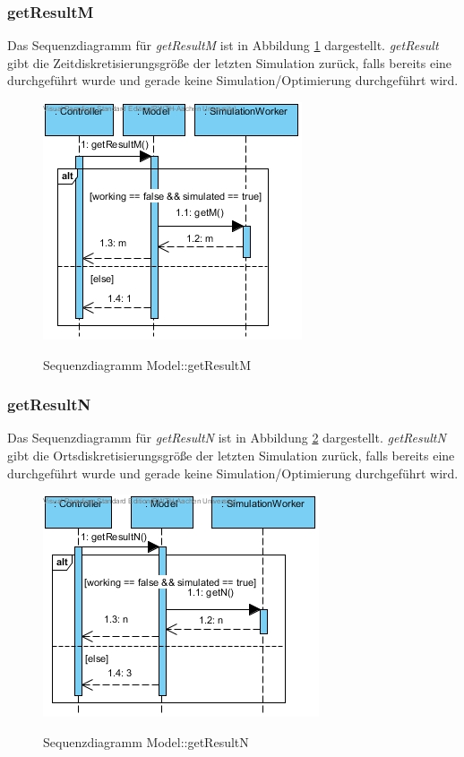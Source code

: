 \subsubsection*{getResultM}

Das Sequenzdiagramm für \emph{getResultM} ist in Abbildung \ref{Sequenzdiagramm Model::getResultM} dargestellt. \emph{getResult} gibt die Zeitdiskretisierungsgröße der letzten Simulation zurück, falls bereits eine durchgeführt wurde und gerade keine Simulation/Optimierung durchgeführt wird.

\begin{figure}[H]
	\centering
	\includegraphics[scale=.85]{Bilder/Model__getResultM().jpg}\\
	\caption{Sequenzdiagramm Model::getResultM}
	\label{Sequenzdiagramm Model::getResultM}
\end{figure}

\subsubsection*{getResultN}

Das Sequenzdiagramm für \emph{getResultN} ist in Abbildung \ref{Sequenzdiagramm Model::getResultN} dargestellt. \emph{getResultN} gibt die Ortsdiskretisierungsgröße der letzten Simulation zurück, falls bereits eine durchgeführt wurde und gerade keine Simulation/Optimierung durchgeführt wird.

\begin{figure}[H]
	\centering
	\includegraphics[scale=.85]{Bilder/Model__getResultN().jpg}\\
	\caption{Sequenzdiagramm Model::getResultN}
	\label{Sequenzdiagramm Model::getResultN}
\end{figure}

